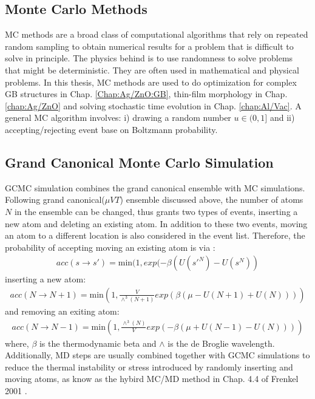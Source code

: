 \subsection{Monte Carlo Methods}
\label{Chap:Mech:GCMC:MC}

\ac{MC} methods are a broad class of computational algorithms that rely on repeated random sampling to obtain numerical results for a problem that is difficult to solve in principle. The physics behind is to use randomness to solve problems that might be deterministic. They are often used in mathematical \cite{hubbard2009modeling} and physical \cite{bortz1975new} problems. In this thesis, \ac{MC} methods are used to do optimization for complex \ac{GB} structures in Chap. \ref{Chap:Ag/ZnO:GB}, thin-film morphology in Chap. \ref{chap:Ag/ZnO} and solving stochastic time evolution in Chap. \ref{chap:Al/Vac}. A general \ac{MC} algorithm involves: i) drawing a random number $u \in (0,1]$ and ii) accepting/rejecting event base on Boltzmann probability.

\subsection{Grand Canonical Monte Carlo Simulation}
\label{Chap:Mech:GCMC:GCMC}

\ac{GCMC} simulation combines the grand canonical ensemble with \ac{MC} simulations. Following grand canonical($\mu VT$) ensemble discussed above, the number of atoms $N$ in the ensemble can be changed, thus grants two types of events, inserting a new atom and deleting an existing atom. In addition to these two events, moving an atom to a different location is also considered in the event list. Therefore, the probability of accepting moving an existing atom is via \cite{frenkel2001understanding}:
\begin{align}
acc(s \rightarrow s') = \text{min}(1, exp(-\beta(U(s'^N) - U(s^N))
\label{Chap:Meth:eq:acc:move}
\end{align}
inserting a new atom:
\begin{align}
acc(N \rightarrow N+1) = \text{min}(1, \frac{V}{\wedge^3(N+1)}exp(\beta(\mu - U(N + 1) + U(N)))) \label{Chap:Meth:eq:acc:insert}
\end{align}
and removing an exiting atom:
\begin{align}
acc(N \rightarrow N-1) = \text{min}(1, \frac{\wedge^3(N)}{V}exp(-\beta(\mu + U(N - 1) - U(N)))) \label{Chap:Meth:eq:acc:remove}
\end{align}
where, $\beta$ is the thermodynamic beta and $\wedge$ is the de Broglie wavelength. Additionally, \ac{MD} steps are usually combined together with \ac{GCMC} simulations to reduce the thermal instability or stress introduced by randomly inserting and moving atoms, as know as the hybird \ac{MC}/\ac{MD} method in Chap. 4.4 of Frenkel 2001 \cite{frenkel2001understanding}.